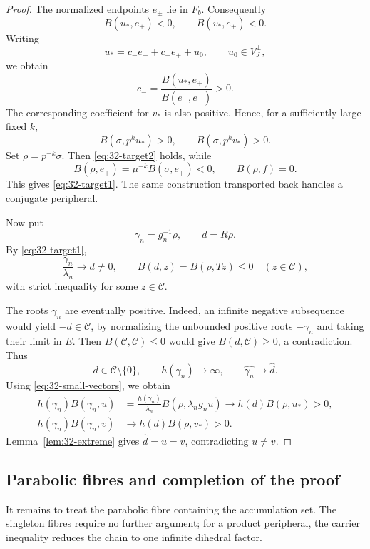 \documentclass[11pt,reqno]{amsart}
\theoremstyle{plain}
\theoremstyle{definition}
\theoremstyle{remark}
\numberwithin{equation}{section}
\begin{document}
\begin{proof}
The normalized endpoints $e_\pm$ lie in $F_b$.
Consequently
\[
    B(u_*,e_+)<0,\qquad B(v_*,e_+)<0.
\]
Writing
\[
    u_*=c_-e_-+c_+e_++u_0,
    \qquad u_0\in V_J^\perp,
\]
we obtain
\[
    c_-=\frac{B(u_*,e_+)}{B(e_-,e_+)}>0.
\]
The corresponding coefficient for $v_*$ is also positive.
Hence, for a sufficiently large fixed $k$,
\[
    B(\sigma,p^ku_*)>0,\qquad
    B(\sigma,p^kv_*)>0.
\]
Set $\rho=p^{-k}\sigma$.
Then \eqref{eq:32-target2} holds, while
\[
    B(\rho,e_+)=\mu^{-k}B(\sigma,e_+)<0,
    \qquad
    B(\rho,f)=0.
\]
This gives \eqref{eq:32-target1}.
The same construction transported back handles a
conjugate peripheral.

Now put
\[
    \gamma_n=g_n^{-1}\rho,\qquad d=R\rho.
\]
By \eqref{eq:32-target1},
\[
    \frac{\gamma_n}{\lambda_n}\to d\ne0,
    \qquad
    B(d,z)=B(\rho,Tz)\leq0
    \quad(z\in\mathcal C),
\]
with strict inequality for some $z\in\mathcal C$.

The roots $\gamma_n$ are eventually positive.
Indeed, an infinite negative subsequence would yield
$-d\in\mathcal C$, by normalizing the unbounded positive
roots $-\gamma_n$ and taking their limit in $E$.
Then $B(\mathcal C,\mathcal C)\leq0$ would give
$B(d,\mathcal C)\geq0$, a contradiction.
Thus
\[
    d\in\mathcal C\setminus\{0\},
    \qquad
    h(\gamma_n)\to\infty,
    \qquad
    \widehat{\gamma_n}\to\widehat d.
\]
Using \eqref{eq:32-small-vectors}, we obtain
\begin{align*}
    h(\gamma_n)B(\gamma_n,u)
    &=
    \frac{h(\gamma_n)}{\lambda_n}
    B(\rho,\lambda_ng_nu)
    \longrightarrow h(d)B(\rho,u_*)>0,\\
    h(\gamma_n)B(\gamma_n,v)
    &\longrightarrow h(d)B(\rho,v_*)>0.
\end{align*}
Lemma~\ref{lem:32-extreme} gives
$\widehat d=u=v$, contradicting $u\ne v$.
\end{proof}

\subsection{Parabolic fibres and completion of the proof}\label{subsec:32-parabolic}

It remains to treat the parabolic fibre containing the accumulation set.
The singleton fibres require no further argument; for a product peripheral,
the carrier inequality reduces the chain to one infinite dihedral factor.
\end{document}
